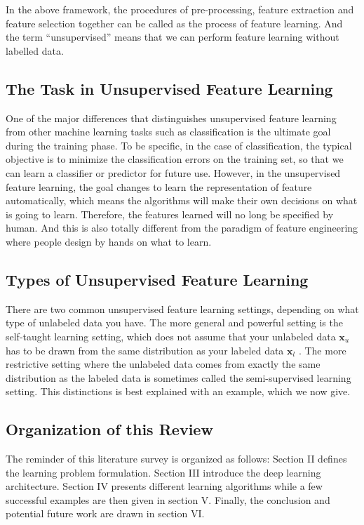 \documentclass[conference]{IEEEtran}
\begin{document}
In the above framework, the procedures of pre-processing, feature extraction and feature selection together can be called as the process of feature learning. And the term ``unsupervised'' means that we can perform feature learning without labelled data.

\subsection{The Task in Unsupervised Feature Learning}



One of the major differences that distinguishes unsupervised feature learning from other machine learning tasks such as classification is the ultimate goal during the training phase. To be specific, in the case of classification, the typical objective is to minimize the classification errors on the training set, so that we can learn a classifier or predictor for future use. However, in the unsupervised feature learning, the goal changes to learn the representation of feature automatically, which means the algorithms will make their own decisions on what is going to learn. Therefore, the features learned will no long be specified by human. And this is also totally different from the paradigm of feature engineering where people design by hands on what to learn.

\subsection{Types of Unsupervised Feature Learning}

There are two common unsupervised feature learning settings, depending on what type of unlabeled data you have. The more general and powerful setting is the self-taught learning setting, which does not assume that your unlabeled data $\mathbf{x}_u$ has to be drawn from the same distribution as your labeled data $\mathbf{x}_l$ \cite{self_taught}. The more restrictive setting where the unlabeled data comes from exactly the same distribution as the labeled data is sometimes called the semi-supervised learning setting. This distinctions is best explained with an example, which we now give.

\subsection{Organization of this Review}

The reminder of this literature survey is organized as follows: Section II defines the learning problem formulation. Section III introduce the deep learning architecture. Section IV presents different learning algorithms while a few successful examples are then given in section V. Finally, the conclusion and potential future work are drawn in section VI.
\end{document}
